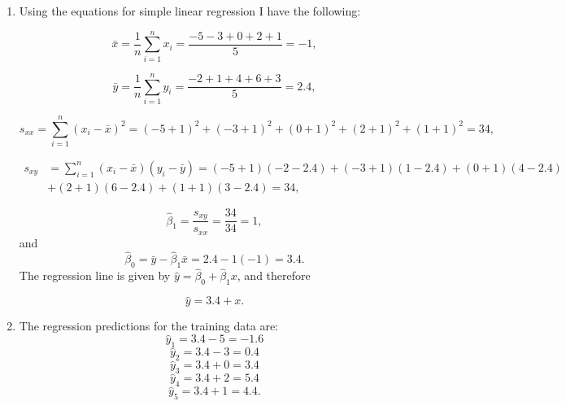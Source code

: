 \begin{problem}{21}$ $
\begin{enumerate}

\item Using the equations for simple linear regression I have the following:

\begin{equation*}
\bar x = \frac{1}{n}\sum_{i=1}^n x_i= \frac{-5-3+0+2+1}{5} = -1,
\end{equation*}

\begin{equation*}
\bar y= \frac{1}{n}\sum_{i=1}^n y_i= \frac{-2+1+4+6+3}{5} = 2.4,
\end{equation*}

\begin{equation*}
s_{xx} = \sum_{i=1}^n(x_i-\bar x)^2 = (-5+1)^2+(-3+1)^2+(0+1)^2+(2+1)^2+(1+1)^2 = 34,
\end{equation*}

\begin{align*}
s_{xy} &= \sum_{i=1}^n(x_i-\bar x)(y_i-\bar y) = (-5+1)(-2-2.4)+(-3+1)(1-2.4)+(0+1)(4-2.4)\\ 
&+(2+1)(6-2.4) +(1+1)(3-2.4) = 34,
\end{align*}

\begin{equation*}
\hat \beta_1 = \frac{s_{xy}}{s_{xx}} = \frac{34}{34}=1,
\end{equation*}
and
\begin{equation*}
\hat \beta_0 = \bar y - \hat \beta_1 \bar x = 2.4-1(-1) = 3.4.
\end{equation*}
The regression line is given by $\hat y = \hat \beta_0+\hat \beta_1 x$, and therefore

\begin{equation*}
\hat y =3.4+x.
\end{equation*}

\item The regression predictions for the training data are:
\begin{equation*}
\hat y_1 = 3.4-5=-1.6
\end{equation*}
\begin{equation*}
\hat y_2 = 3.4-3=0.4
\end{equation*}
\begin{equation*}
\hat y_3 = 3.4+0=3.4
\end{equation*}
\begin{equation*}
\hat y_4 = 3.4+2=5.4
\end{equation*}
\begin{equation*}
\hat y_5 = 3.4+1=4.4.
\end{equation*}


\end{enumerate}
\end{problem}
